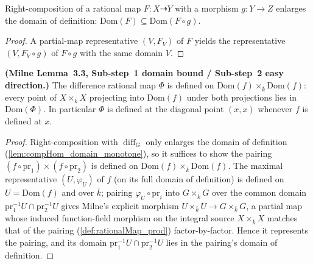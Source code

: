 \begin{lemma}\leanok
  \label{lem:compHom_domain_monotone}
  Right-composition of a rational map \(F \colon X \dashrightarrow Y\) with a morphism
  \(g \colon Y \to Z\) enlarges the domain of definition:
  \(\mathrm{Dom}(F) \subseteq \mathrm{Dom}(F \circ g)\).
\end{lemma}
\begin{proof}\leanok
  A partial-map representative \((V, F_V)\) of \(F\) yields the representative
  \((V, F_V \circ g)\) of \(F \circ g\) with the same domain \(V\).
\end{proof}

\begin{lemma}\leanok
  \label{lem:difference_map_domain_lower_bound}
  \textbf{(Milne Lemma~3.3, Sub-step~1 domain bound / Sub-step~2 easy direction.)} The
  difference rational map \(\Phi\) is defined on \(\mathrm{Dom}(f) \times_{\bar k}
  \mathrm{Dom}(f)\): every point of \(X \times_{\bar k} X\) projecting into
  \(\mathrm{Dom}(f)\) under both projections lies in \(\mathrm{Dom}(\Phi)\). In
  particular \(\Phi\) is defined at the diagonal point \((x, x)\) whenever \(f\) is
  defined at \(x\).
\end{lemma}
\begin{proof}\leanok
  Right-composition with \(\operatorname{diff}_G\) only enlarges the domain of
  definition (\cref{lem:compHom_domain_monotone}), so it suffices to show the pairing
  \((f \circ \mathrm{pr}_1) \times (f \circ \mathrm{pr}_2)\) is defined on
  \(\mathrm{Dom}(f) \times_{\bar k} \mathrm{Dom}(f)\). The maximal representative
  \((U, \varphi_U)\) of \(f\) (on its full domain of definition) is defined on \(U =
  \mathrm{Dom}(f)\) and over \(\bar k\); pairing \(\varphi_U \circ \mathrm{pr}_i\) into
  \(G \times_{\bar k} G\) over the common domain
  \(\mathrm{pr}_1^{-1}U \cap \mathrm{pr}_2^{-1}U\) gives Milne's explicit morphism
  \(U \times_{\bar k} U \to G \times_{\bar k} G\), a partial map whose induced
  function-field morphism on the integral source \(X \times_{\bar k} X\) matches that of
  the pairing (\cref{def:rationalMap_prod}) factor-by-factor. Hence it represents the
  pairing, and its domain \(\mathrm{pr}_1^{-1}U \cap \mathrm{pr}_2^{-1}U\) lies in the
  pairing's domain of definition.
\end{proof}

